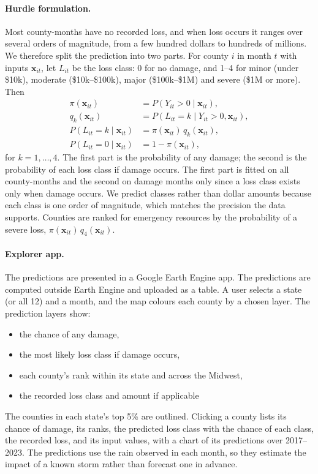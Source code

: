 \documentclass[10pt,twocolumn]{article}
\begin{document}
\paragraph{Hurdle formulation.} Most county-months have no recorded loss, and when loss occurs it
ranges over several orders of magnitude, from a few hundred dollars to hundreds of millions. We
therefore split the prediction into two parts. For county $i$ in month $t$ with inputs
$\mathbf{x}_{it}$, let $L_{it}$ be the loss class: 0 for no damage, and 1--4 for minor (under
\$10k), moderate (\$10k--\$100k), major (\$100k--\$1M) and severe (\$1M or more). Then
\begin{align}
\pi(\mathbf{x}_{it}) &= P(Y_{it} > 0 \mid \mathbf{x}_{it}), \\
q_k(\mathbf{x}_{it}) &= P(L_{it} = k \mid Y_{it} > 0, \mathbf{x}_{it}), \\
P(L_{it} = k \mid \mathbf{x}_{it}) &= \pi(\mathbf{x}_{it}) \, q_k(\mathbf{x}_{it}), \\
P(L_{it} = 0 \mid \mathbf{x}_{it}) &= 1 - \pi(\mathbf{x}_{it}),
\end{align}
for $k = 1, \dots, 4$.
The first part is the probability of any damage; the second is the probability of each loss class if
damage occurs. The first part is fitted on all county-months and the second on damage months
only since a loss class exists only when damage occurs. We predict classes rather than dollar amounts because each class is one order of magnitude,
which matches the precision the data supports. Counties are ranked for emergency resources by the
probability of a severe loss, $\pi(\mathbf{x}_{it}) \, q_4(\mathbf{x}_{it})$. 

\paragraph{Explorer app.} The predictions are presented in a Google Earth Engine app. The
predictions are computed outside Earth Engine and uploaded as a table. A user selects a state (or
all 12) and a month, and the map colours each county by a chosen layer. The prediction layers
show:
\begin{itemize}
  \item the chance of any damage,
  \item the most likely loss class if damage occurs,
  \item each county's rank within its state and across the Midwest,
  \item the recorded loss class and amount if applicable
\end{itemize}
The counties in each state's top 5\% are outlined.  Clicking a county lists its chance of damage, its ranks, the predicted loss class with the chance of each class, the recorded loss, and its input values,
with a chart of its predictions over 2017--2023. The predictions use the rain observed in each
month, so they estimate the impact of a known storm rather than forecast one in advance.
\end{document}
